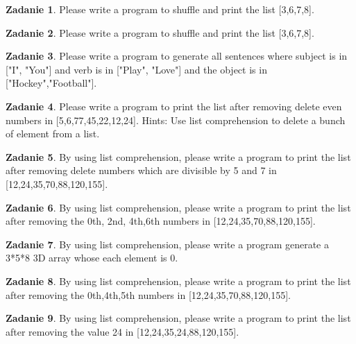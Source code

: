 \documentclass[11pt]{article}
\theoremstyle{definition}
\newtheorem{zadanie}{Zadanie}
\begin{document}
\begin{zadanie}
Please write a program to shuffle and print the list [3,6,7,8].

\end{zadanie}

\begin{zadanie}
Please write a program to shuffle and print the list [3,6,7,8].

\end{zadanie}

\begin{zadanie}
Please write a program to generate all sentences where subject is in ["I", "You"] and verb is in ["Play", "Love"] and the object is in ["Hockey","Football"].

\end{zadanie}

\begin{zadanie}
Please write a program to print the list after removing delete even numbers in [5,6,77,45,22,12,24].
Hints:
Use list comprehension to delete a bunch of element from a list.

\end{zadanie}

\begin{zadanie}
By using list comprehension, please write a program to print the list after removing delete numbers which are divisible by 5 and 7 in [12,24,35,70,88,120,155].

\end{zadanie}

\begin{zadanie}
By using list comprehension, please write a program to print the list after removing the 0th, 2nd, 4th,6th numbers in [12,24,35,70,88,120,155].

\end{zadanie}

\begin{zadanie}
By using list comprehension, please write a program generate a 3*5*8 3D array whose each element is 0.

\end{zadanie}

\begin{zadanie}
By using list comprehension, please write a program to print the list after removing the 0th,4th,5th numbers in [12,24,35,70,88,120,155].

\end{zadanie}

\begin{zadanie}
By using list comprehension, please write a program to print the list after removing the value 24 in [12,24,35,24,88,120,155].

\end{zadanie}
\end{document}
